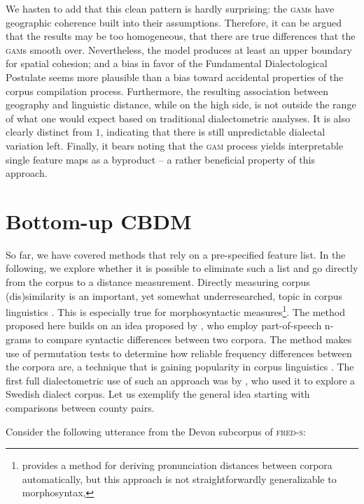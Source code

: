 \documentclass[output=paper]{LSP/langsci}
\begin{document}
We hasten to add that this clean pattern is hardly surprising: the \textsc{gam}s have geographic coherence built into their assumptions. 
Therefore, it can be argued that the results may be too homogeneous, that there are true differences that the \textsc{gam}s smooth over.
Nevertheless, the model produces at least an upper boundary for spatial cohesion; and a bias in favor of the Fundamental Dialectological Postulate seems more plausible than a bias toward accidental properties of the corpus compilation process.
Furthermore, the resulting association between geography and linguistic distance, while on the high side, is not outside the range of what one would expect based on traditional dialectometric analyses.
It is also clearly distinct from $1$, indicating that there is still unpredictable dialectal variation left.
Finally, it bears noting that the \textsc{gam} process yields interpretable single feature maps as a byproduct -- a rather beneficial property of this approach.

\section{Bottom-up CBDM} \label{bottomup}

So far, we have covered methods that rely on a pre-specified feature list.
In the following, we explore whether it is possible to eliminate such a list and go directly from the corpus to a distance measurement.
Directly measuring corpus (dis)similarity is an important, yet somewhat underresearched, topic in corpus linguistics \citep{kilgarriff_comparing_2001}.
This is especially true for morphosyntactic measures\footnote{\citet{scherrer_recovering_2012} provides a method for deriving pronunciation distances between corpora automatically, but this approach is not straightforwardly generalizable to morphosyntax,}.
The method proposed here builds on an idea proposed by \citet{nerbonne_measure_2006}, who employ part-of-speech n-grams to compare syntactic differences between two corpora.
The method makes use of permutation tests to determine how reliable frequency differences between the corpora are, a technique that is gaining popularity in corpus linguistics \citep{lijffijt_computational_2013}.
The first full dialectometric use of such an approach was by \citet{sanders_statistical_2010}, who used it to explore a Swedish dialect corpus.
Let us exemplify the general idea starting with comparisons between county pairs.

Consider the following utterance from the Devon subcorpus of \textsc{fred-s}:
\end{document}
